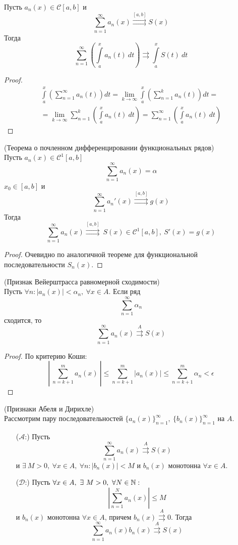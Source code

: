 \begin{theorem}
    Пусть $a_n(x)\in \mathcal{C}[a,b]$ и
    \[\sum_{n=1}^{\infty}a_n(x)\overset{[a,b]}{\rightrightarrows} S(x)\]
    Тогда 
    \[\sum_{n=1}^{\infty}\left(\int\limits_{a}^{x}a_n(t)\ dt\right)\rightrightarrows \int\limits_{a}^{x}S(t)\ dt\]
\end{theorem}
\begin{proof}
    \begin{multline*}
        \int\limits_{a}^{x}\left(\sum_{n=1}^{\infty}a_n(t)\right) dt=\lim\limits_{k\to \infty}\int\limits_{a}^{x}\left(\sum\limits_{n=1}^{k}a_n(t)\right)dt=\\
        =\lim\limits_{k\to \infty}\sum\limits_{n=1}^{k}\left(\int\limits_{a}^{x}a_n(t)\ dt\right)=\sum_{n=1}^{\infty}\left(\int\limits_{a}^{x}a_n(t)\ dt\right)
    \end{multline*}
\end{proof}
\begin{theorem} (Теорема о почленном дифференцировании функциональных рядов)\\
    Пусть $a_n(x)\in \mathcal{C}^1{[a,b]}$
    \[\sum_{n=1}^{\infty}a_n(x)=\alpha\]
    $x_0\in [a,b]$ и 
    \[\sum_{n=1}^{\infty}a_n'(x)\overset{[a,b]}\rightrightarrows g(x)\]
    Тогда
    \[\sum_{n=1}^{\infty}a_n(x)\overset{[a,b]}{\rightrightarrows}\ S(x)\in \mathcal{C}^1[a,b],\ S'(x)=g(x)\]
\end{theorem}
\begin{proof}
    Очевидно по аналогичной теореме для функциональной последовательности $S_n(x)$.
\end{proof}
\begin{theorem} (Признак Вейерштрасса равномерной сходимости)\\
    Пусть $\forall n: |a_n(x)|<\alpha_n,\ \forall x\in A$. Если ряд
    \[\sum_{n=1}^{\infty}\alpha_n\]
    сходится, то
    \[\sum_{n=1}^{\infty}a_n(x)\overset{A}\rightrightarrows S(x)\]
\end{theorem}
\begin{proof} По критерию Коши:
    \[\left|\ \sum_{n=k+1}^{m}a_n(x)\ \right|\leq \sum_{n=k+1}^{m}|a_n(x)|\leq \sum_{n=k+1}^{m}\alpha_n<\epsilon\]
\end{proof}
\begin{theorem} (Признаки Абеля и Дирихле)\\
    Рассмотрим пару последовательностей $\{a_n(x)\}_{n=1}^{\infty},\ \{b_n(x)\}_{n=1}^{\infty}$ на $A$.
    \begin{itemize}
        \item[($\mathcal{A}$:)] Пусть 
        \[\sum_{n=1}^{\infty}a_n(x)\overset{A}\rightrightarrows S(x)\]
        и $\exists\ M>0,\ \forall x\in A,\ \forall n: |b_n(x)|<M$ и $b_n(x)$ монотонна $\forall x\in A$.
        \item[($\mathcal{D}$:)] Пусть $\forall x\in A,\ \exists\ M>0,\ \forall N\in \N:$ 
        \[\left|\sum_{n=1}^{N}a_n(x)\right|\leq M\]
        и $b_n(x)$ монотонна $\forall x\in A$, причем $b_n(x)\overset{A}\rightrightarrows 0$. Тогда 
        \[\sum_{n=1}^{\infty}a_n(x)b_n(x) \overset{A}\rightrightarrows S(x)\]
    \end{itemize}
\end{theorem}
